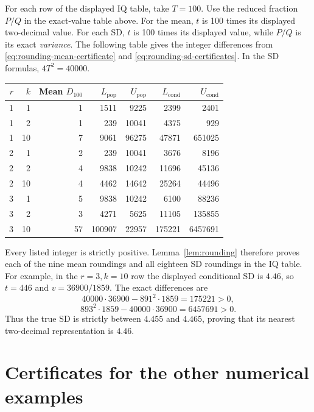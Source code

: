 For each row of the displayed IQ table, take \(T=100\). Use the reduced
fraction \(P/Q\) in the exact-value table above. For the mean, \(t\) is
100 times its displayed two-decimal value. For each SD, \(t\) is 100 times
its displayed value, while \(P/Q\) is its exact \emph{variance}.
The following table gives the integer differences from
\eqref{eq:rounding-mean-certificate} and
\eqref{eq:rounding-sd-certificates}. In the SD formulas,
\(4T^2=40000\).

\begin{center}
\begingroup
\small
\setlength{\tabcolsep}{5pt}
\begin{tabular}{rr r rr rr}
\hline
\(r\) & \(k\) & Mean \(D_{100}\) &
\(L_{\mathrm{pop}}\) & \(U_{\mathrm{pop}}\) &
\(L_{\mathrm{cond}}\) & \(U_{\mathrm{cond}}\) \\
\hline
1 & 1  & 1  & 1511   & 9225  & 2399   & 2401 \\
1 & 2  & 1  & 239    & 10041 & 4375   & 929 \\
1 & 10 & 7  & 9061   & 96275 & 47871  & 651025 \\
2 & 1  & 2  & 239    & 10041 & 3676   & 8196 \\
2 & 2  & 4  & 9838   & 10242 & 11696  & 45136 \\
2 & 10 & 4  & 4462   & 14642 & 25264  & 44496 \\
3 & 1  & 5  & 9838   & 10242 & 6100   & 88236 \\
3 & 2  & 3  & 4271   & 5625  & 11105  & 135855 \\
3 & 10 & 57 & 100907 & 22957 & 175221 & 6457691 \\
\hline
\end{tabular}
\endgroup
\end{center}

Every listed integer is strictly positive. Lemma~\ref{lem:rounding}
therefore proves each of the nine mean roundings and all eighteen SD
roundings in the IQ table. For example, in the \(r=3,k=10\) row the
displayed conditional SD is \(4.46\), so \(t=446\) and \(v=36900/1859\).
The exact differences are
\[
 40000\cdot36900-891^2\cdot1859=175221>0,
\]
\[
 893^2\cdot1859-40000\cdot36900=6457691>0.
\]
Thus the true SD is strictly between \(4.455\) and \(4.465\), proving
that its nearest two-decimal representation is \(4.46\).

\section{Certificates for the other numerical examples}

